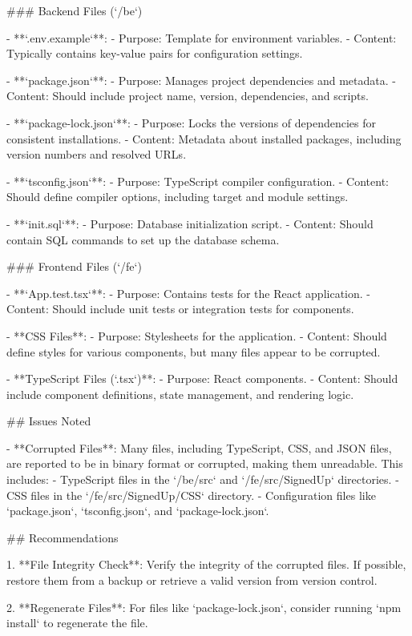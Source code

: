 \documentclass{article}
\begin{document}
\begin{itemize}[leftmargin=*]
### Backend Files (`/be`)

- **`.env.example`**: 
  - Purpose: Template for environment variables.
  - Content: Typically contains key-value pairs for configuration settings.

- **`package.json`**: 
  - Purpose: Manages project dependencies and metadata.
  - Content: Should include project name, version, dependencies, and scripts.

- **`package-lock.json`**: 
  - Purpose: Locks the versions of dependencies for consistent installations.
  - Content: Metadata about installed packages, including version numbers and resolved URLs.

- **`tsconfig.json`**: 
  - Purpose: TypeScript compiler configuration.
  - Content: Should define compiler options, including target and module settings.

- **`init.sql`**: 
  - Purpose: Database initialization script.
  - Content: Should contain SQL commands to set up the database schema.

### Frontend Files (`/fe`)

- **`App.test.tsx`**: 
  - Purpose: Contains tests for the React application.
  - Content: Should include unit tests or integration tests for components.

- **CSS Files**: 
  - Purpose: Stylesheets for the application.
  - Content: Should define styles for various components, but many files appear to be corrupted.

- **TypeScript Files (`.tsx`)**: 
  - Purpose: React components.
  - Content: Should include component definitions, state management, and rendering logic.

## Issues Noted

- **Corrupted Files**: Many files, including TypeScript, CSS, and JSON files, are reported to be in binary format or corrupted, making them unreadable. This includes:
  - TypeScript files in the `/be/src` and `/fe/src/SignedUp` directories.
  - CSS files in the `/fe/src/SignedUp/CSS` directory.
  - Configuration files like `package.json`, `tsconfig.json`, and `package-lock.json`.

## Recommendations

1. **File Integrity Check**: Verify the integrity of the corrupted files. If possible, restore them from a backup or retrieve a valid version from version control.

2. **Regenerate Files**: For files like `package-lock.json`, consider running `npm install` to regenerate the file.


\end{itemize}
\end{document}
